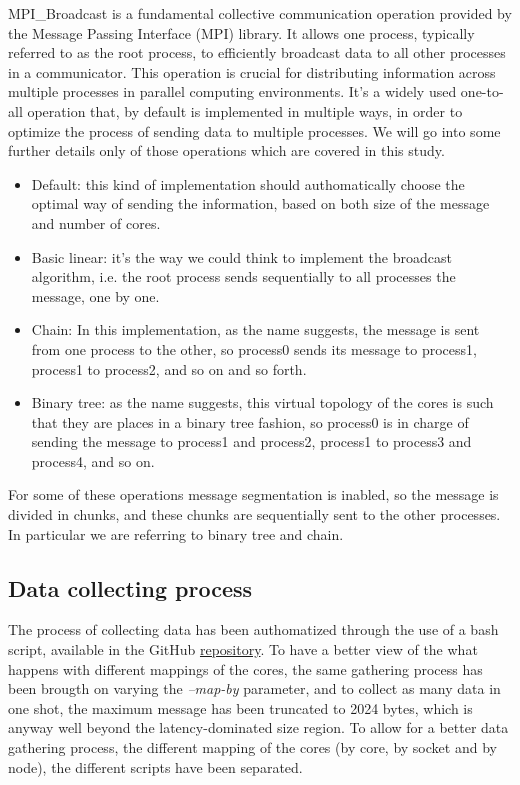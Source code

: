 \documentclass{article}
\begin{document}
	MPI\_Broadcast is a fundamental collective communication operation provided by the Message Passing Interface (MPI) library. It allows one process, typically referred to as the root process, to efficiently broadcast data to all other processes in a communicator. This operation is crucial for distributing information across multiple processes in parallel computing environments. It's a widely used one-to-all operation that, by default is implemented in multiple ways, in order to optimize the process of sending data to multiple processes.
	We will go into some further details only of those operations which are covered in this study.
	\begin{itemize}
		\item Default: this kind of implementation should authomatically choose the optimal way of sending the information, based on both size of the message and number of cores.\\
		\item Basic linear: it's the way we could think to implement the broadcast algorithm, i.e. the root process sends sequentially to all processes the message, one by one.\\
		\item Chain: In this implementation, as the name suggests, the message is sent from one process to the other, so process0 sends its message to process1, process1 to process2, and so on and so forth.\\
		\item Binary tree: as the name suggests, this virtual topology of the cores is such that they are places in a binary tree fashion, so process0 is in charge of sending the message to process1 and process2, process1 to process3 and process4, and so on.
	\end{itemize}
	
	For some of these operations message segmentation is inabled, so the message is divided in chunks, and these chunks are sequentially sent to the other processes. In particular we are referring to binary tree and chain.
	
	\subsection{Data collecting process}
	The process of collecting data has been authomatized through the use of a bash script, available in the GitHub \href{https://github.com/ValentinisAlessio/HPC_final_project}{repository}. 
	To have a better view of the what happens with different mappings of the cores, the same gathering process has been brougth on varying the \textit{--map-by} parameter, and to collect as many data in one shot, the maximum message has been truncated to 2024 bytes, which is anyway well beyond the latency-dominated size region.
	To allow for a better data gathering process, the different mapping of the cores (by core, by socket and by node), the different scripts have been separated.
	
\end{document}
